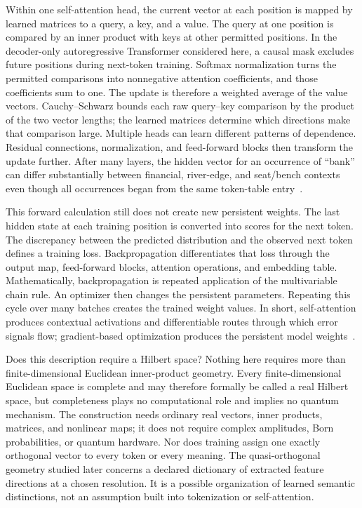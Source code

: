 \documentclass[
  aps,
  reprint,
  superscriptaddress,
  floatfix,
  nofootinbib,
  longbibliography
]{revtex4-2}
\begin{document}
Within one self-attention head, the current vector at each position is mapped
by learned matrices to a query, a key, and a value.  The query at one position
is compared by an inner product with keys at other permitted positions.  In
the decoder-only autoregressive Transformer considered here, a causal mask
excludes future positions during next-token training.  Softmax normalization
turns the permitted comparisons into nonnegative attention coefficients, and
those coefficients sum to one.  The update is therefore a weighted average of
the value vectors.  Cauchy--Schwarz bounds each raw query--key comparison by the
product of the two vector lengths; the learned matrices determine which
directions make that comparison large.
Multiple heads can learn different patterns of dependence.  Residual
connections, normalization, and feed-forward blocks then transform the update
further.  After many layers, the hidden vector for an occurrence of ``bank''
can differ substantially between financial, river-edge, and seat/bench
contexts even though all occurrences began from the same token-table
entry~\cite{Vaswani-2017-Attention}.

This forward calculation still does not create new persistent weights.  The
last hidden state at each training position is converted into scores for the
next token.  The discrepancy between the predicted distribution and the
observed next token defines a training loss.  Backpropagation differentiates
that loss through the output map, feed-forward blocks, attention operations,
and embedding table.  Mathematically, backpropagation is repeated application
of the multivariable chain rule.  An optimizer then changes the persistent
parameters.
Repeating this cycle over many batches creates the trained weight values.  In
short, self-attention produces contextual activations and differentiable
routes through which error signals flow; gradient-based optimization produces
the persistent model weights~\cite{Goodfellow-et-al-2016-Book}.

Does this description require a Hilbert space?  Nothing here requires more
than finite-dimensional Euclidean inner-product geometry.  Every
finite-dimensional Euclidean space is complete and may therefore formally be
called a real Hilbert space, but completeness plays no computational role and
implies no quantum mechanism.  The
construction needs ordinary real vectors, inner products, matrices, and
nonlinear maps; it does not require complex amplitudes, Born probabilities, or
quantum hardware.  Nor does training assign one exactly orthogonal vector to
every token or every meaning.  The quasi-orthogonal geometry studied later
concerns a declared dictionary of extracted feature directions at a chosen
resolution.  It is a possible organization of learned semantic distinctions,
not an assumption built into tokenization or self-attention.
\end{document}
